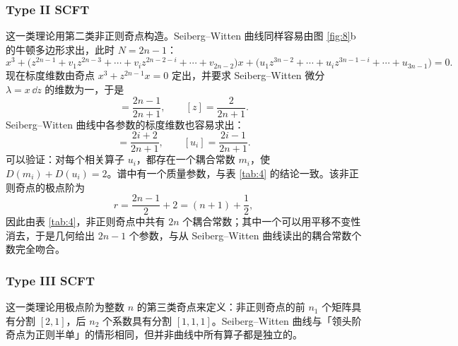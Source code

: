 \subsubsection{Type II SCFT}
\label{sec:5.1.2}

这一类理论用第二类非正则奇点构造。Seiberg--Witten 曲线同样容易由图 \ref{fig:8}b 的牛顿多边形求出，此时 $N = 2n-1$：
\begin{equation}
x^3 + \bigl(z^{2n-1} + v_1z^{2n-3} + \cdots + v_iz^{2n-2-i} + \cdots + v_{2n-2}\bigr)x
+ \bigl(u_1z^{3n-2} + \cdots + u_iz^{3n-1-i} + \cdots + u_{3n-1}\bigr) = 0 .
\label{eq:5.12}\tag{5.12}
\end{equation}
现在标度维数由奇点 $x^3+z^{2n-1}x=0$ 定出，并要求 Seiberg--Witten 微分 $\lambda = x\,\dd z$ 的维数为一，于是
\begin{equation}
[x] = \frac{2n-1}{2n+1},\qquad [z] = \frac{2}{2n+1}.
\label{eq:5.13}\tag{5.13}
\end{equation}
Seiberg--Witten 曲线中各参数的标度维数也容易求出：
\begin{equation}
[v_i] = \frac{2i+2}{2n+1},\qquad [u_i] = \frac{2i-1}{2n+1}.
\label{eq:5.14}\tag{5.14}
\end{equation}
可以验证：对每个相关算子 $u_i$，都存在一个耦合常数 $m_i$，使 $D(m_i)+D(u_i)=2$。谱中有一个质量参数，与表 \ref{tab:4} 的结论一致。该非正则奇点的极点阶为
\begin{equation}
r = \frac{2n-1}{2} + 2 = (n+1) + \frac{1}{2},
\label{eq:5.15}\tag{5.15}
\end{equation}
因此由表 \ref{tab:4}，非正则奇点中共有 $2n$ 个耦合常数；其中一个可以用平移不变性消去，于是几何给出 $2n-1$ 个参数，与从 Seiberg--Witten 曲线读出的耦合常数个数完全吻合。

\subsubsection{Type III SCFT}
\label{sec:5.1.3}

这一类理论用极点阶为整数 $n$ 的第三类奇点来定义：非正则奇点的前 $n_1$ 个矩阵具有分割 $[2,1]$，后 $n_2$ 个系数具有分割 $[1,1,1]$。Seiberg--Witten 曲线与「领头阶奇点为正则半单」的情形相同，但并非曲线中所有算子都是独立的。

